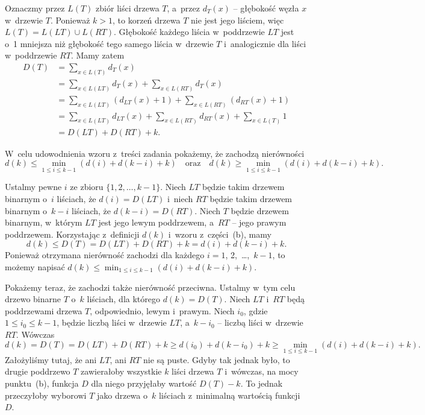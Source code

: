 \subproblem %
Oznaczmy przez $L(T)$ zbiór liści drzewa $T$, a~przez $d_T(x)$ -- głębokość węzła $x$ w~drzewie $T$. Ponieważ $k>1$, to korzeń drzewa $T$ nie jest jego liściem, więc $L(T)=L(LT)\cup L(RT)$. Głębokość każdego liścia w~poddrzewie $LT$ jest o~1 mniejsza niż głębokość tego samego liścia w~drzewie $T$ i~analogicznie dla liści w~poddrzewie $RT$. Mamy zatem
\begin{align*}
    D(T) &= \sum_{x\in L(T)}d_T(x) \\
	&= \sum_{x\in L(LT)}d_T(x)+\sum_{x\in L(RT)}d_T(x) \\
	&= \sum_{x\in L(LT)}(d_{LT}(x)+1)+\sum_{x\in L(RT)}(d_{RT}(x)+1) \\
	&= \sum_{x\in L(LT)}d_{LT}(x)+\sum_{x\in L(RT)}d_{RT}(x)+\sum_{x\in L(T)}1 \\[1mm]
	&= D(LT)+D(RT)+k.
\end{align*}

\subproblem %

\noindent W~celu udowodnienia wzoru z~treści zadania pokażemy, że zachodzą nierówności
\[
    d(k) \le \min_{1\le i\le k-1}(d(i)+d(k-i)+k) \quad\text{oraz}\quad d(k) \ge \min_{1\le i\le k-1}(d(i)+d(k-i)+k).
\]

Ustalmy pewne $i$ ze zbioru $\{1,2,\dots,k-1\}$. Niech $LT$ będzie takim drzewem binarnym o~$i$ liściach, że $d(i)=D(LT)$ i~niech $RT$ będzie takim drzewem binarnym o~$k-i$ liściach, że $d(k-i)=D(RT)$. Niech $T$ będzie drzewem binarnym, w~którym $LT$ jest jego lewym poddrzewem, a~$RT$ -- jego prawym poddrzewem. Korzystając z~definicji $d(k)$ i~wzoru z~części~(b), mamy
\[
    d(k) \le D(T) = D(LT)+D(RT)+k = d(i)+d(k-i)+k.
\]
Ponieważ otrzymana nierówność zachodzi dla każdego $i=1$, 2,~\dots,~$k-1$, to możemy napisać $d(k)\le\min_{1\le i\le k-1}(d(i)+d(k-i)+k)$.

Pokażemy teraz, że zachodzi także nierówność przeciwna. Ustalmy w~tym celu drzewo binarne $T$ o~$k$ liściach, dla którego $d(k)=D(T)$. Niech $LT$ i~$RT$ będą poddrzewami drzewa $T$, odpowiednio, lewym i~prawym. Niech $i_0$, gdzie $1\le i_0\le k-1$, będzie liczbą liści w~drzewie $LT$, a~$k-i_0$ -- liczbą liści w~drzewie $RT$. Wówczas
\[
    d(k) = D(T) = D(LT)+D(RT)+k \ge d(i_0)+d(k-i_0)+k \ge \min_{1\le i\le k-1}(d(i)+d(k-i)+k).
\]
Założyliśmy tutaj, że ani $LT$, ani $RT$ nie są puste. Gdyby tak jednak było, to drugie poddrzewo $T$ zawierałoby wszystkie $k$ liści drzewa $T$ i~wówczas, na mocy punktu~(b), funkcja $D$ dla niego przyjęłaby wartość $D(T)-k$. To jednak przeczyłoby wyborowi $T$ jako drzewa o~$k$ liściach z~minimalną wartością funkcji $D$.

